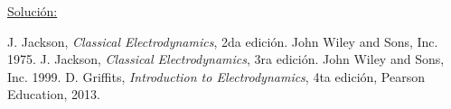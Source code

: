 \documentclass[a4paper,10pt]{article}
\numberwithin{equation}{section}
\begin{document}
\vspace{.3cm}

\underline{Solución:} \vspace{.3cm}

\begin{thebibliography}{10}
J. Jackson, \emph{Classical Electrodynamics}, 2da edición. John Wiley and Sons, Inc. 
1975.
J. Jackson, \emph{Classical Electrodynamics}, 3ra edición. John Wiley and Sons, Inc. 
1999.
D. Griffits, \emph{Introduction to Electrodynamics}, 4ta edición, Pearson Education, 
2013.
\end{thebibliography}
\end{document}
